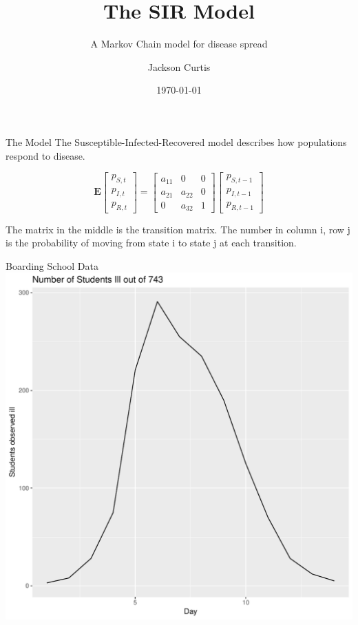 \documentclass[10pt,table]{beamer}
\title{The SIR Model}
\subtitle{A Markov Chain model for disease spread}
\date{\today}
\author{Jackson Curtis}
\institute{Brigham Young University}
\begin{document}
\maketitle

\begin{frame}[fragile]{The Model}
The Susceptible-Infected-Recovered model describes how populations respond to disease.

$$\mathbf{E}\begin{bmatrix}
    p_{S,t}       \\
    p_{I,t}      \\

    p_{R,t}     
\end{bmatrix}
=
\begin{bmatrix}
a_{11} & 0 & 0 \\
a_{21} & a_{22} & 0 \\
0 & a_{32} & 1
\end{bmatrix}
\begin{bmatrix}
    p_{S,t-1}       \\
    p_{I,t-1}      \\

    p_{R,t-1}     
\end{bmatrix}
\label{sdf}
$$

The matrix in the middle is the transition matrix. The number in column i, row j is the probability of moving from state i to state j at each transition.
\end{frame}

\begin{frame}[fragile]{Boarding School Data}
\centering
\includegraphics[scale=.45]{BoardingData.pdf}

\end{frame}
\end{document}

